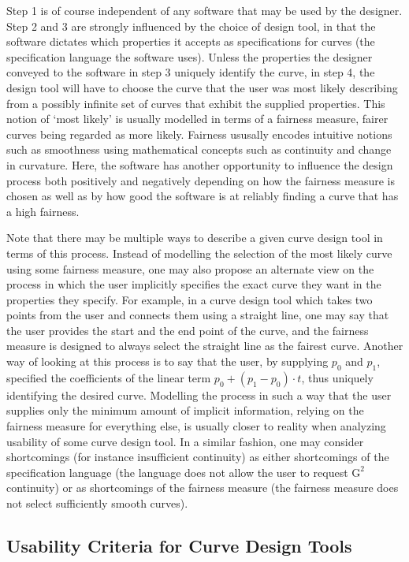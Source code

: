 \documentclass[a4paper]{article}
\begin{document}
			Step 1 is of course independent of any software that may be used by the designer. Step 2 and 3 are strongly influenced by the choice of design tool, in that the software dictates which properties it accepts as specifications for curves (the specification language the software uses). Unless the properties the designer conveyed to the software in step 3 uniquely identify the curve, in step 4, the design tool will have to choose the curve that the user was most likely describing from a possibly infinite set of curves that exhibit the supplied properties. This notion of `most likely' is usually modelled in terms of a fairness measure, fairer curves being regarded as more likely. Fairness ususally encodes intuitive notions such as smoothness using mathematical concepts such as continuity and change in curvature. Here, the software has another opportunity to influence the design process both positively and negatively depending on how the fairness measure is chosen as well as by how good the software is at reliably finding a curve that has a high fairness.

			Note that there may be multiple ways to describe a given curve design tool in terms of this process. Instead of modelling the selection of the most likely curve using some fairness measure, one may also propose an alternate view on the process in which the user implicitly specifies the exact curve they want in the properties they specify. For example, in a curve design tool which takes two points from the user and connects them using a straight line, one may say that the user provides the start and the end point of the curve, and the fairness measure is designed to always select the straight line as the fairest curve. Another way of looking at this process is to say that the user, by supplying \(p_0\) and \(p_1\), specified the coefficients of the linear term \(p_0 + \left(p_1 - p_0\right) \cdot t\), thus uniquely identifying the desired curve. Modelling the process in such a way that the user supplies only the minimum amount of implicit information, relying on the fairness measure for everything else, is usually closer to reality when analyzing usability of some curve design tool. In a similar fashion, one may consider shortcomings (for instance insufficient continuity) as either shortcomings of the specification language (the language does not allow the user to request \(\mathrm{G}^2\) continuity) or as shortcomings of the fairness measure (the fairness measure does not select sufficiently smooth curves).

		\subsection{Usability Criteria for Curve Design Tools}
		\label{section:usability_criteria_curve_design_tools}
\end{document}
